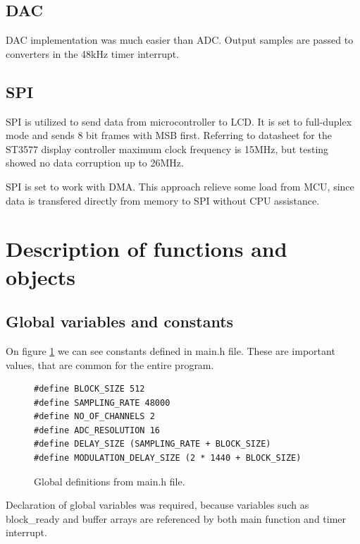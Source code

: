 \documentclass[a4paper,twoside,12pt]{book}
\begin{document}
\subsection{DAC}
DAC implementation was much easier than ADC.
Output samples are passed to converters in the 48kHz timer interrupt.

\subsection{SPI}
SPI is utilized to send data from microcontroller to LCD.
It is set to full-duplex mode and sends 8 bit frames with MSB first.
Referring to datasheet for the ST3577 display controller
maximum clock frequency is 15MHz,
but testing showed no data corruption up to 26MHz.
\cite{Sitronix:ST7735}

SPI is set to work with DMA.
This approach relieve some load from MCU,
since data is transfered directly from memory
to SPI without CPU assistance.

\section{Description of functions and objects}

\subsection{Global variables and constants}
On figure \ref{fig:defs} we can see constants defined in main.h file.
These are important values, that are common for the entire program.

\begin{figure}[H]
\centering
\begin{lstlisting}
#define BLOCK_SIZE 512
#define SAMPLING_RATE 48000
#define NO_OF_CHANNELS 2
#define ADC_RESOLUTION 16
#define DELAY_SIZE (SAMPLING_RATE + BLOCK_SIZE)
#define MODULATION_DELAY_SIZE (2 * 1440 + BLOCK_SIZE)
\end{lstlisting}
\caption{Global definitions from main.h file.}
\label{fig:defs}
\end{figure}

Declaration of global variables was required, because
variables such as block\_ready and buffer arrays are referenced by
both main function and timer interrupt.
\end{document}
